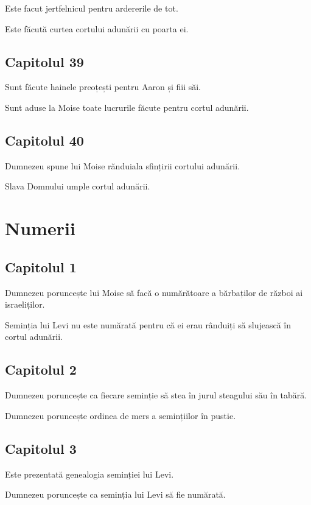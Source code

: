 \documentclass[12pt,a4paper]{article}
\begin{document}
Este facut jertfelnicul pentru ardererile de tot.

Este făcută curtea cortului adunării cu poarta ei.

\subsection{Capitolul 39}

Sunt făcute hainele preoțești pentru Aaron și fiii săi.

Sunt aduse la Moise toate lucrurile făcute pentru cortul adunării.

\subsection{Capitolul 40}

Dumnezeu spune lui Moise rănduiala sfințirii cortului adunării.

Slava Domnului umple cortul adunării.

\section{Numerii}

\subsection{Capitolul 1}

Dumnezeu poruncește lui Moise să facă o numărătoare a bărbaților de război ai israeliților.

Seminția lui Levi nu este numărată pentru că ei erau rânduiți să slujească în cortul adunării.

\subsection{Capitolul 2}

Dumnezeu poruncește ca fiecare seminție să stea în jurul steagului său în tabără.

Dumnezeu poruncește ordinea de mers a semințiilor în pustie.

\subsection{Capitolul 3}

Este prezentată genealogia seminției lui Levi.

Dumnezeu poruncește ca seminția lui Levi să fie numărată.
\end{document}
